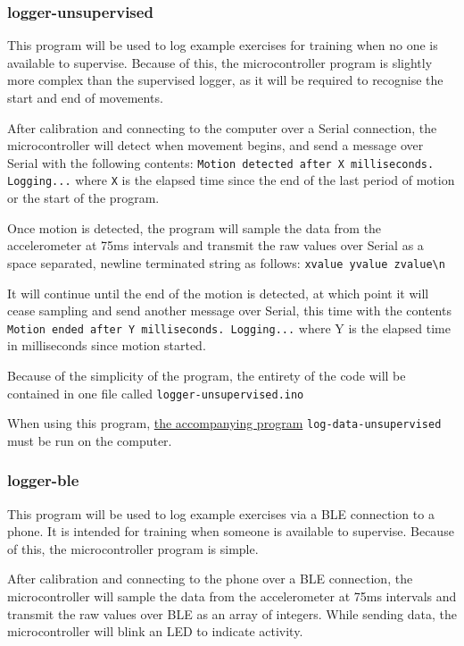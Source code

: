 \documentclass[a4paper]{article}
\begin{document}
\subsubsection{logger-unsupervised}%
\label{subsubsec:dc_msa_loggerunsupervised}

This program will be used to log example exercises for training when no one is available to supervise. Because of this, the microcontroller program is slightly more complex than the supervised logger, as it will be required to recognise the start and end of movements.

After calibration and connecting to the computer over a Serial connection, the microcontroller will detect when movement begins, and send a message over Serial with the following contents: \lstinline{Motion detected after X milliseconds. Logging...} where \lstinline{X} is the elapsed time since the end of the last period of motion or the start of the program.

Once motion is detected, the program will sample the data from the accelerometer at 75ms intervals and transmit the raw values over Serial as a space separated, newline terminated string as follows:
\lstinline|xvalue yvalue zvalue\n|

It will continue until the end of the motion is detected, at which point it will cease sampling and send another message over Serial, this time with the contents \lstinline{Motion ended after Y milliseconds. Logging...} where Y is the elapsed time in milliseconds since motion started.

Because of the simplicity of the program, the entirety of the code will be contained in one file called \lstinline{logger-unsupervised.ino}

When using this program, \hyperref[subsubsec:dc_csa_logunsupervised]{the accompanying program} \lstinline{log-data-unsupervised} must be run on the computer.

\subsubsection{logger-ble}%
\label{subsubsec:dc_msa_loggerble}

This program will be used to log example exercises via a BLE connection to a phone. It is intended for training when someone is available to supervise. Because of this, the microcontroller program is simple.

After calibration and connecting to the phone over a BLE connection, the microcontroller will sample the data from the accelerometer at 75ms intervals and transmit the raw values over BLE as an array of integers.
While sending data, the microcontroller will blink an LED to indicate activity.
\end{document}
